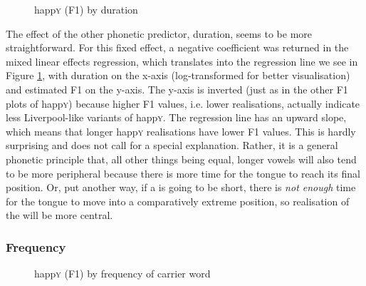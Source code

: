 	\begin{figure}[h!]
		\centering
		\resizebox{0.5\linewidth}{!}{}
		\caption{happ\textsc{y} (F1) by duration}
		\label{fig.scatter.f1w.happy.dur}
	\end{figure}

The effect of the other phonetic predictor, duration, seems to be more straightforward.
For this fixed effect, a negative coefficient was returned in the mixed linear effects regression, which translates into the regression line we see in Figure \ref{fig.scatter.f1w.happy.dur}, with duration on the x-axis (log-transformed for better visualisation) and estimated F1 on the y-axis.
The y-axis is inverted (just as in the other F1 plots of happ\textsc{y}) because higher F1 values, i.e. lower realisations, actually indicate less Liverpool-like variants of happ\textsc{y}.
The regression line has an upward slope, which means that longer happ\textsc{y} realisations have lower F1 values.
This is hardly surprising and does not call for a special explanation.
Rather, it is a general phonetic principle that, all other things being equal, longer vowels will also tend to be more peripheral because there is more time for the tongue to reach its final position.
Or, put another way, if a  is going to be short, there is \emph{not enough} time for the tongue to move into a comparatively extreme position, so realisation of the  will be more central.

			\subsubsection{Frequency}
			\label{sec.prod.res.vow.happy.f1.zipf}

	\begin{figure}[h!]
		\centering
		\resizebox{0.5\linewidth}{!}{}
		\caption{happ\textsc{y} (F1) by frequency of carrier word}
		\label{fig.scatter.f1w.happy.zipf}
	\end{figure}

